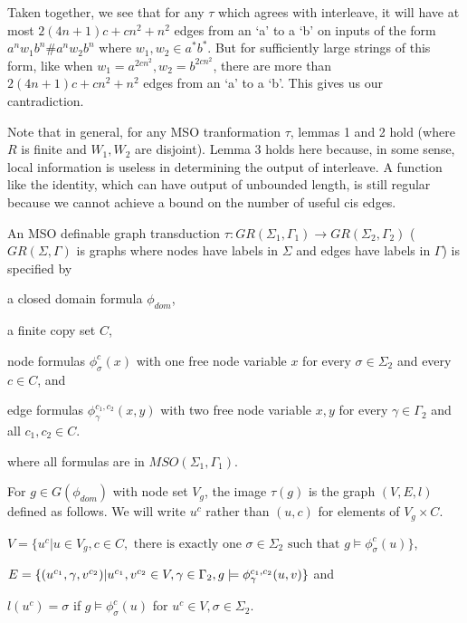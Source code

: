 \documentclass[10pt]{IEEEtran}%
\begin{document}
Taken together, we see that for any $\tau$ which agrees with interleave, it will have at most $2(4n+1)c + cn^2 + n^2$ edges from an `a' to a `b' on inputs of the form $a^{n}w_1b^{n}\#a^{n}w_2b^{n}$ where $w_1, w_2 \in a^*b^*$. But for sufficiently large strings of this form, like when $w_1 = a^{2cn^2}, w_2 = b^{2cn^2}$, there are more than $2(4n+1)c + cn^2 + n^2$ edges from an `a' to a `b'. This gives us our cantradiction. 

Note that in general, for any MSO tranformation $\tau$, lemmas 1 and 2 hold (where $R$ is finite and $W_1, W_2$ are disjoint). Lemma 3 holds here because, in some sense, local information is useless in determining the output of interleave. A function like the identity, which can have output of unbounded length, is still regular because we cannot achieve a bound on the number of useful cis edges. 

\newpage

An MSO definable graph transduction $\tau: GR(\Sigma_1, \Gamma_1) \to GR(\Sigma_2, \Gamma_2)$ ($GR(\Sigma, \Gamma)$ is graphs where nodes have labels in $\Sigma$ and edges have labels in $\Gamma$) is specified by 

a closed domain formula $\phi_{dom}$, 

a finite copy set $C$, 

node formulas $\phi_\sigma^c(x)$ with one free node variable $x$ for every $\sigma \in \Sigma_2$ and every $c \in C$, and

edge formulas $\phi_\gamma^{c_1, c_2}(x, y)$ with two free node variable $x, y$ for every $\gamma \in \Gamma_2$ and all $c_1, c_2 \in C$. 

where all formulas are in $MSO(\Sigma_1, \Gamma_1)$. 

For $g \in G(\phi_{dom})$ with node set $V_g$, the image $\tau(g)$ is the graph $(V, E, l)$ defined as follows. We will write $u^c$ rather than $(u, c)$ for elements of $V_g \times C$. 

$V = \{u^c | u \in V_g, c \in C, \text{ there is exactly one } \sigma \in \Sigma_2 \text{ such that } g\models \phi_\sigma^c(u)\}$,

$E = \{(u^{c_1}, \gamma, v^{c_2}) | u^{c_1}, v^{c_2} \in V, \gamma \in \Gamma_2, \\ g \models \phi_\gamma^{c_1, c_2}(u, v)\}$ and

$l(u^c) = \sigma$ if $g \models \phi_\sigma^c(u)$ for $u^c \in V, \sigma \in \Sigma_2$.

 
\end{document}
